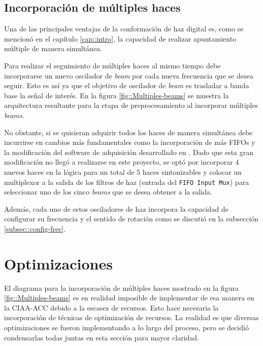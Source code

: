 \documentclass[../../main.tex]{subfiles}
\begin{document}


\subsection{Incorporación de múltiples haces}\label{subsec::multiples-haces}
Una de las principales ventajas de la conformación de haz digital es, como se mencionó en el capítulo \ref{cap::intro}, la capacidad de realizar apuntamiento múltiple de manera simultánea. 

Para realizar el seguimiento de múltiples haces al mismo tiempo debe incorporarse un nuevo oscilador de \textit{beam} por cada nueva frecuencia que se desea seguir. Esto es así ya que el objetivo de oscilador de \textit{beam} es trasladar a banda base la señal de interés. En la figura \ref{fig::Multiples-beams} se muestra la arquitectura resultante para la etapa de preprocesamiento al incorporar múltiples \textit{beams}.

No obstante, si se quisieran adquirir todos los haces de manera simultánea debe incurrirse en cambios más fundamentales como la incorporación de más FIFOs y la modificación del software de adquisición desarrollado en \cite{proyecto-jose}. Dado que esta gran modificación no llegó a realizarse en este proyecto, se optó por incorporar 4 nuevos haces en la lógica para un total de 5 haces sintonizables y colocar un multiplexor a la salida de los filtros de haz (entrada del \texttt{FIFO Input Mux}) para seleccionar uno de los cinco \textit{beams} que se desea obtener a la salida.

Además, cada uno de estos osciladores de haz incorpora la capacidad de configurar su frecuencia y el sentido de rotación como se discutió en la subsección \ref{subsec::config-frec}.


\section{Optimizaciones}\label{sec::optimizaciones}
El diagrama para la incorporación de múltiples haces mostrado en la figura \ref{fig::Multiples-beams} es en realidad imposible de implementar de esa manera en la CIAA-ACC debido a la escasez de recursos. Esto hace necesaria la incorporación de técnicas de optimización de recursos. La realidad es que diversas optimizaciones se fueron implementando a lo largo del proceso, pero se decidió condensarlas todas juntas en esta sección para mayor claridad.
\end{document}

